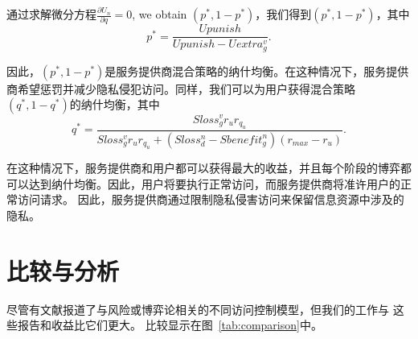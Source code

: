 通过求解微分方程$\frac{\partial U_n}{\partial q}=0$, we obtain $(p^*,1-p^*)$，我们得到$(p^*,1-p^*)$，其中
\begin{equation}
p^*=\dfrac{Upunish}{Upunish-Uextra_g^v}.
\end{equation}

因此，$(p^*,1-p^*)$是服务提供商混合策略的纳什均衡。在这种情况下，服务提供商希望惩罚并减少隐私侵犯访问。同样，我们可以为用户获得混合策略$(q^*,1-q^*)$的纳什均衡，其中
\begin{equation}
q^*=\dfrac{Sloss_g^v r_u r_{q_u}}{Sloss_g^v r_u  r_{q_u} +(Sloss_d^n -Sbenefit_g^n)(r_{max}-r_u)}.
\end{equation}

在这种情况下，服务提供商和用户都可以获得最大的收益，并且每个阶段的博弈都可以达到纳什均衡。因此，用户将要执行正常访问，而服务提供商将准许用户的正常访问请求。 因此，服务提供商通过限制隐私侵害访问来保留信息资源中涉及的隐私。

\section{比较与分析}
\label{sec:comparison}

尽管有文献\cite{ni2010risk,wang2011quantified,shaikh2012dynamic,santos2016,wang2019,zhang2015towards,zhen2015,zhang2018privacy,gao2018game,liu2016dynamic,helil2017non,hu2014game,ding2019}报道了与风险或博弈论相关的不同访问控制模型，但我们的工作与 这些报告和收益比它们更大。 比较显示在图~\ref{tab:comparison}中。

